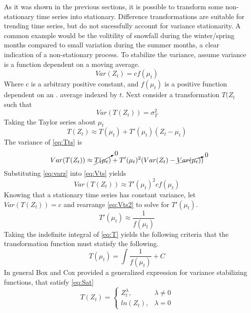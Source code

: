 As it was shown in the previous sections, it is possible to transform some non-stationary time series into stationary. Difference transformations are suitable for trending time series, but do not sucessfully account for variance stationarity. A common example would be the volitility of snowfall during the winter/spring months compared to small variation during the summer months, a clear indication of a non-stationary process. To stabilize the variance, assume variance is a function dependent on a moving average.
\begin{equation}\label{eq:varz}
Var(Z_t) = cf(\mu_t)
\end{equation}
Where $c$ is a arbitrary positive constant, and $f(\mu_t)$ is a positive function dependent on an . average indexed by $t$. Next consider a transformation $T(Z_t$ such that
\begin{equation}
Var(T(Z_t)) = \sigma^2_T
\end{equation}
Taking the Taylor series about $\mu_t$
\begin{equation} \label{eq:Tts}
T(Z_t) \approx T(\mu_t) + T'(\mu_t)(Z_t-\mu_t)
\end{equation}
The variance of \ref{eq:Tts} is
\begin{equation} \label{eq:Vts}
Var(T(Z_t)) \approx \cancelto{0}{T(\mu_t)} + T'(\mu_t)^2(Var(Z_t)-\cancelto{0}{Var(\mu_t)})
\end{equation}
Substituting \ref{eq:varz} into \ref{eq:Vts} yields
\begin{equation}\label{eq:Vts2}
Var(T(Z_t)) \approx T'(\mu_t)^2 cf(\mu_t)
\end{equation}
Knowing that a stationary time series has constant variance, let $Var(T(Z_t)) = c$ and rearrange \ref{eq:Vts2} to solve for $T'(\mu_t)$.
\begin{equation}\label{eq:T}
T'(\mu_t) \approx \frac{1}{f(\mu_t)}
\end{equation}
Taking the indefinite integral of \ref{eq:T} yields the following criteria that the transformation function must statisfy the following.
\begin{equation}\label{eq:Sat}
T(\mu_t) = \int \frac{1}{f(\mu_t)} + C
\end{equation}
In general Box and Cox provided a generalized expression for variance stabilizing functions\cite{box1964analysis}, that satisfy \ref{eq:Sat}
\begin{equation}
  T(Z_t)=\begin{cases}
    Z_t^{\lambda}, & \lambda \neq 0\\
    ln(Z_t), & \lambda = 0
  \end{cases}
\end{equation}

